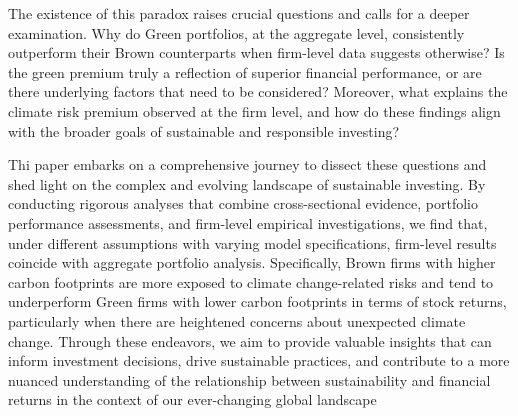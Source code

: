 \documentclass[12pt]{article}
\begin{document}
The existence of this paradox raises crucial questions and calls for a deeper examination. Why do Green portfolios, at the aggregate level, consistently outperform their Brown counterparts when firm-level data suggests otherwise? Is the green premium truly a reflection of superior financial performance, or are there underlying factors that need to be considered? Moreover, what explains the climate risk premium observed at the firm level, and how do these findings align with the broader goals of sustainable and responsible investing?

Thi paper embarks on a comprehensive journey to dissect these questions and shed light on the complex and evolving landscape of sustainable investing. By conducting rigorous analyses that combine cross-sectional evidence, portfolio performance assessments, and firm-level empirical investigations, we find that, under different assumptions with varying model specifications, firm-level results coincide with aggregate portfolio analysis. Specifically, Brown firms with higher carbon footprints are more exposed to climate change-related risks and tend to underperform Green firms with lower carbon footprints in terms of stock returns, particularly when there are heightened concerns about unexpected climate change. Through these endeavors, we aim to provide valuable insights that can inform investment decisions, drive sustainable practices, and contribute to a more nuanced understanding of the relationship between sustainability and financial returns in the context of our ever-changing global landscape

\begingroup
{}


\endgroup


\end{document}
